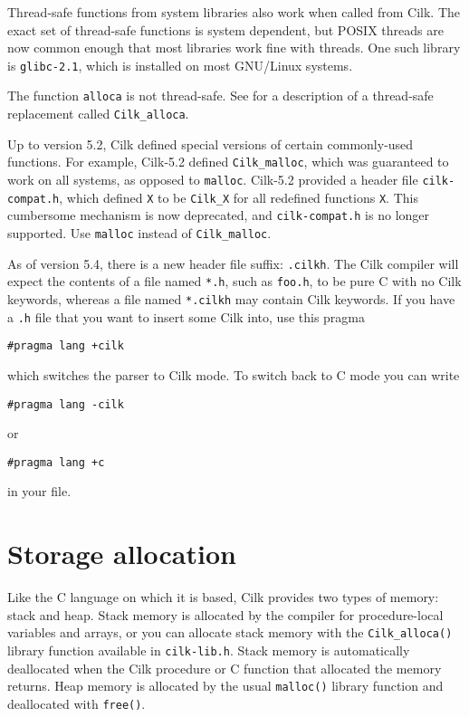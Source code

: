 Thread-safe functions from system libraries also work when called from
Cilk.  The exact set of thread-safe functions is system dependent, but
POSIX threads are now common enough that most libraries work fine
with threads.  One such library is \texttt{glibc-2.1}, which is
installed on most GNU/Linux systems.  

The function \texttt{alloca} is not thread-safe.  See
 for a description of a thread-safe replacement
called \texttt{Cilk\_alloca}.

Up to version 5.2, Cilk defined special versions of certain
commonly-used functions.  For example, Cilk-5.2 defined
\texttt{Cilk\_malloc}, which was guaranteed to work on all systems, as
opposed to \texttt{malloc}.  Cilk-5.2 provided a header file
\texttt{cilk-compat.h}, which defined \texttt{X} to be
\texttt{Cilk\_X} for all redefined functions \texttt{X}.  This
cumbersome mechanism is now deprecated, and \texttt{cilk-compat.h} is
no longer supported.  Use \texttt{malloc} instead of
\texttt{Cilk\_malloc}.

As of version 5.4, there is a new header file suffix: \texttt{.cilkh}.
The Cilk compiler will expect the contents of a file named
\texttt{*.h}, such as \texttt{foo.h}, to be pure C with no Cilk
keywords, whereas a file named \texttt{*.cilkh} may contain Cilk
keywords.  If you have a \texttt{.h} file that you want to insert some Cilk into, use this pragma
\begin{verbatim}
#pragma lang +cilk
\end{verbatim}
which switches the parser to Cilk mode.  To switch back to C mode you can write
\begin{verbatim}
#pragma lang -cilk
\end{verbatim}
or
\begin{verbatim}
#pragma lang +c
\end{verbatim}
in your file.

\section{Storage allocation}
\indexalloc{|(}
\label{sec:storage}

Like the C language on which it is based, Cilk provides two types of
memory: stack and heap.  Stack memory is allocated by the compiler for
procedure-local variables and arrays, or you can allocate stack memory
with the \texttt{Cilk\_alloca()} library function available in
\texttt{cilk-lib.h}.  Stack memory is automatically deallocated when
the Cilk procedure or C function that allocated the memory returns.
Heap memory is allocated by the usual \texttt{malloc()} library
function and deallocated with \texttt{free()}.  

